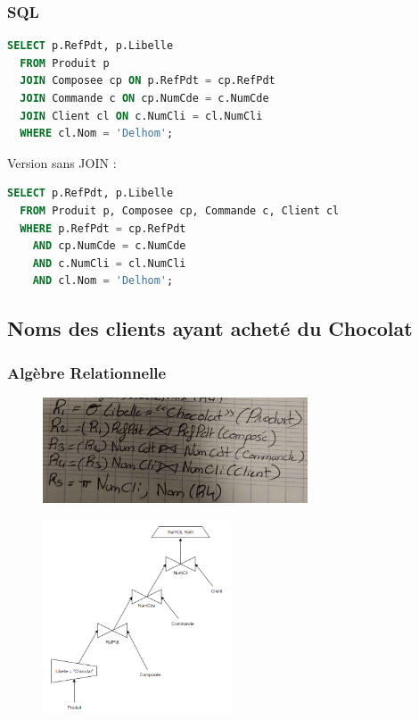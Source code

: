 \documentclass{article}
\begin{document}
\subsubsection{SQL}

\begin{lstlisting}[language=SQL]
  SELECT p.RefPdt, p.Libelle 
  FROM Produit p
  JOIN Composee cp ON p.RefPdt = cp.RefPdt
  JOIN Commande c ON cp.NumCde = c.NumCde
  JOIN Client cl ON c.NumCli = cl.NumCli
  WHERE cl.Nom = 'Delhom';
\end{lstlisting}

Version sans JOIN :

\begin{lstlisting}[language=SQL]
  SELECT p.RefPdt, p.Libelle 
  FROM Produit p, Composee cp, Commande c, Client cl
  WHERE p.RefPdt = cp.RefPdt 
    AND cp.NumCde = c.NumCde 
    AND c.NumCli = cl.NumCli 
    AND cl.Nom = 'Delhom';
\end{lstlisting}

\subsection{Noms des clients ayant acheté du Chocolat}

\subsubsection{Algèbre Relationnelle}

\begin{figure}[H]
  \centering
  \includegraphics[width=0.7\textwidth]{alg/7.png}
  \label{fig:alg-rel}
\end{figure}

\begin{figure}[H]
  \centering
  \includegraphics[width=0.5\textwidth]{algRel/7.png}
  \label{fig:alg-rel}
\end{figure}
\end{document}
